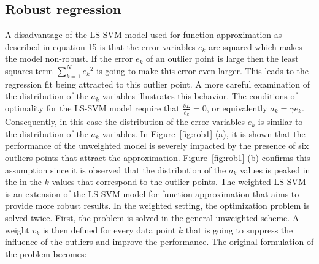 \documentclass[conference,compsoc]{IEEEtran}
\begin{document}
\subsection{Robust regression}
A disadvantage of the LS-SVM model used for function approximation as described in equation 15 is that the error variables $e_k$ are squared  which makes the model non-robust. If the error $e_k$ of an outlier point is large then the least squares term $\sum_{k=1}^{N}{e_k}^2$ is going to make this error even larger. This leads to the regression fit being attracted to this outlier point. A more careful examination of the distribution of the $a_k$ variables illustrates this behavior.
The conditions of optimality for the LS-SVM model require that $\frac{\partial L}{e_k}=0$, or equivalently $a_k=\gamma e_k$. Consequently, in this case the distribution of the error variables $e_k$ is similar to the distribution of the $a_k$ variables. In Figure~\ref{fig:rob1} (a), it is shown that the performance of the unweighted model is severely impacted by the presence of six outliers points that attract the approximation. Figure~\ref{fig:rob1} (b) confirms this assumption since it is observed that the distribution of the $a_k$ values is peaked in the in the $k$ values that correspond to the outlier points. 
The weighted LS-SVM is an extension of the LS-SVM model for function approximation that aims to provide more robust results. In the weighted setting, the optimization problem is solved twice. First, the problem is solved in the general unweighted scheme. A weight $v_k$ is then defined for every data point $k$ that is going to suppress the influence of the outliers and improve the performance. The original formulation of the problem becomes:
\end{document}
